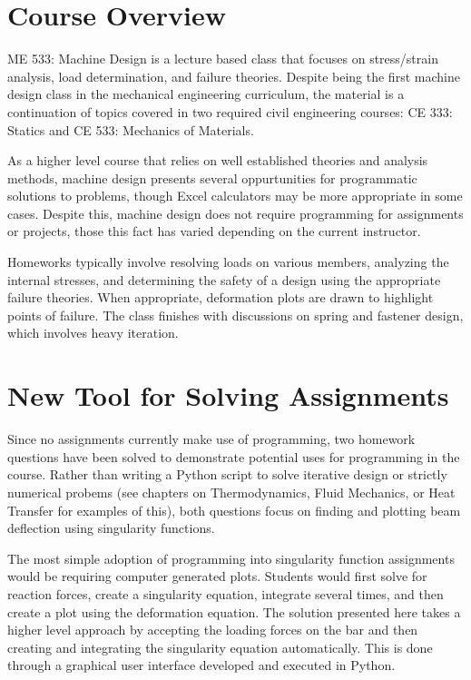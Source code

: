 \section{Course Overview}

ME 533: Machine Design is a lecture based class that focuses on stress/strain analysis, load determination,
and failure theories. Despite being the first machine design class in the mechanical engineering curriculum, 
the material is a continuation of topics covered in two required civil engineering courses: CE 333: Statics
and CE 533: Mechanics of Materials.

As a higher level course that relies on well established theories and analysis methods, machine design
presents several oppurtunities for programmatic solutions to problems, though Excel calculators may
be more appropriate in some cases. Despite this, machine design does not require programming for 
assignments or projects, those this fact has varied depending on the current instructor. 

Homeworks typically involve resolving loads on various members, analyzing the internal stresses, and 
determining the safety of a design using the appropriate failure theories. When appropriate, deformation
plots are drawn to highlight points of failure. The class finishes with discussions on spring and fastener
design, which involves heavy iteration.

\section{New Tool for Solving Assignments}

Since no assignments currently make use of programming, two homework questions have been solved to demonstrate
potential uses for programming in the course. Rather than writing a Python script to solve iterative design or
strictly numerical probems (see chapters on Thermodynamics, Fluid Mechanics, or Heat Transfer for examples of
this), both questions focus on finding and plotting beam deflection using singularity functions. 

The most simple adoption of programming into singularity function assignments would be requiring computer
generated plots. Students would first solve for reaction forces, create a singularity equation, integrate
several times, and then create a plot using the deformation equation. The solution presented here takes a 
higher level approach by accepting the loading forces on the bar and then creating and integrating the 
singularity equation automatically. This is done through a graphical user interface developed and executed
in Python.

